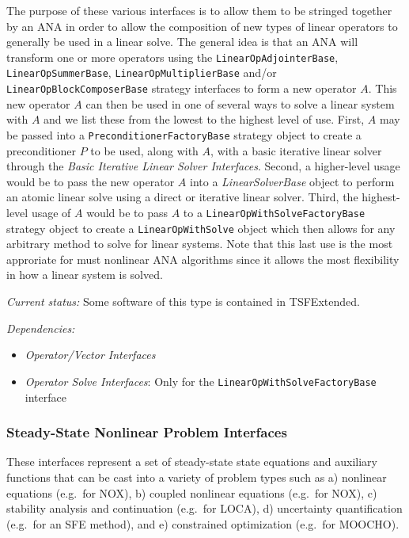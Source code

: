 \documentclass[pdf,ps2pdf,11pt]{SANDreport}
\begin{document}
The purpose of these various interfaces is to allow them to be stringed
together by an ANA in order to allow the composition of new types of linear
operators to generally be used in a linear solve.  The general idea is that an
ANA will transform one or more operators using the
{}\texttt{Linear\-Op\-Adjointer\-Base}, {}\texttt{Linear\-Op\-Summer\-Base},
{}\texttt{Linear\-Op\-Multiplier\-Base} and/or
{}\texttt{Linear\-Op\-Block\-Composer\-Base} strategy interfaces to form a new
operator $A$.  This new operator $A$ can then be used in one of several ways
to solve a linear system with $A$ and we list these from the lowest to the
highest level of use.  First, $A$ may be passed into a
{}\texttt{Preconditioner\-Factory\-Base} strategy object to create a
preconditioner $P$ to be used, along with $A$, with a basic iterative linear
solver through the {}\textit{Basic Iterative Linear Solver Interfaces}.
Second, a higher-level usage would be to pass the new operator $A$ into a
{}\textit{Linear\-Solver\-Base} object to perform an atomic linear solve using
a direct or iterative linear solver.  Third, the highest-level usage of $A$
would be to pass $A$ to a {}\texttt{Linear\-Op\-With\-Solve\-Factory\-Base}
strategy object to create a {}\texttt{Linear\-Op\-With\-Solve} object which
then allows for any arbitrary method to solve for linear systems.  Note that
this last use is the most approriate for must nonlinear ANA algorithms since
it allows the most flexibility in how a linear system is solved.

{}\textit{Current status:} Some software of this type is contained in
TSFExtended.

{}\textit{Dependencies:}
\begin{itemize}
\item {}\textit{Operator/Vector Interfaces}
\item {}\textit{Operator Solve Interfaces}: Only for the {}\texttt{Linear\-Op\-With\-Solve\-Factory\-Base}
interface
\end{itemize}

%
\subsubsection{Steady-State Nonlinear Problem Interfaces}
%

These interfaces represent a set of steady-state state equations and auxiliary
functions that can be cast into a variety of problem types such as a)
nonlinear equations (e.g.\ for NOX), b) coupled nonlinear equations (e.g.\ for
NOX), c) stability analysis and continuation (e.g.\ for LOCA), d) uncertainty
quantification (e.g.\ for an SFE method), and e) constrained optimization
(e.g.\ for MOOCHO).
\end{document}
